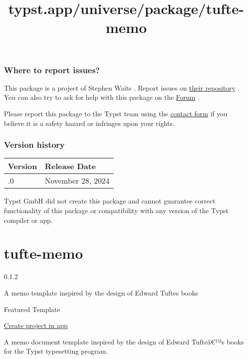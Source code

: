 \subsubsection{Where to report issues?}\label{where-to-report-issues}

This package is a project of Stephen Waits . Report issues on
\href{https://github.com/swaits/typst-collection}{their repository} .
You can also try to ask for help with this package on the
\href{https://forum.typst.app}{Forum} .

Please report this package to the Typst team using the
\href{https://typst.app/contact}{contact form} if you believe it is a
safety hazard or infringes upon your rights.

\label{versions}
\subsubsection{Version history}\label{version-history}

\begin{longtable}[]{@{}ll@{}}
\toprule\noalign{}
Version & Release Date \\
\midrule\noalign{}
\endhead
\bottomrule\noalign{}
\endlastfoot
0.1.0 & November 28, 2024 \\
\end{longtable}

Typst GmbH did not create this package and cannot guarantee correct
functionality of this package or compatibility with any version of the
Typst compiler or app.


\title{typst.app/universe/package/tufte-memo}

\label{banner}
\label{template-thumbnail}

\section{tufte-memo}\label{tufte-memo}

{ 0.1.2 }

A memo template inspired by the design of Edward Tufte\textquotesingle s
books

{ } Featured Template

\href{/app?template=tufte-memo&version=0.1.2}{Create project in app}

\label{readme}
A memo document template inspired by the design of Edward Tufteâ€™s
books for the Typst typesetting program.


